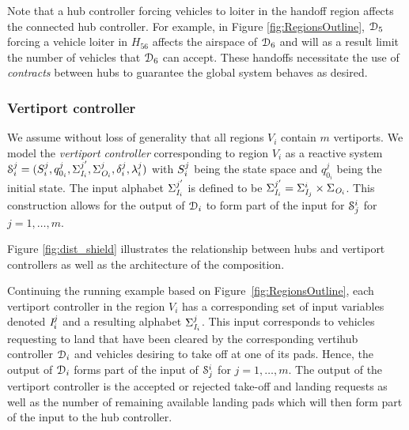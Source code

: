 Note that a hub controller forcing vehicles to loiter in the handoff region affects the connected hub controller.
For example, in Figure \ref{fig:RegionsOutline}, $\mathcal{D}_5$ forcing a vehicle loiter in $H_{56}$ affects the airspace of $\mathcal{D}_6$ and will as a result limit the number of vehicles that $\mathcal{D}_6$ can accept.
These handoffs necessitate the use of \emph{contracts} between hubs to guarantee the global system behaves as desired. 



\subsubsection*{Vertiport controller} We assume without loss of generality that all regions $V_i$ contain $m$ vertiports. We model the \emph{vertiport controller} corresponding to region $V_i$ as a reactive system  $\mathcal{S}_i^j = (S^j_i,q^j_{0_i},\Sigma_{\textit{I}_{i}}^{j'},\Sigma_{\textit{O}_{i}}^j,\delta^j_i,\lambda^j_i)$ with $S^j_i$ being the state space and $q^j_{0_i}$ being the initial state. The input alphabet $\Sigma_{\textit{I}_{i}}^{j'}$ is defined to be $\Sigma_{\textit{I}_{i}}^{j'} = \Sigma_{\textit{I}_{j}}^i\times \Sigma_{\textit{O}_{i}}$. This construction allows for the output of $\mathcal{D}_i$ to form part of the input for $\mathcal{S}^i_j$ for $j = 1,\dots,m$. %

Figure \ref{fig:dist_shield} illustrates the relationship between hubs and vertiport controllers as well as the architecture of the composition. 


\begin{eg}
Continuing the running example based on Figure~\ref{fig:RegionsOutline}, each vertiport controller in the region $V_i$ has a corresponding set of input variables denoted $\textit{I}_i^j$ and a resulting alphabet $\Sigma_{\textit{I}_{i}}^j$. This input corresponds to vehicles requesting to land that have been cleared by the corresponding vertihub controller  $\mathcal{D}_i$ and vehicles desiring to take off at one of its pads.
Hence, the output of $\mathcal{D}_i$ forms part of the input of $\mathcal{S}^i_j$ for $j = 1,\dots,m$.
The output of the vertiport controller is the accepted or rejected take-off and landing requests as well as the number of remaining available landing pads which will then form part of the input to the hub controller. 
\end{eg}



